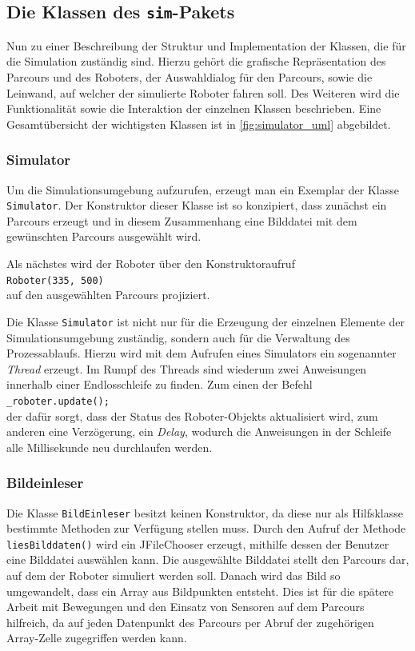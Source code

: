 \documentclass[paper=a4, DIV=calc, BCOR=12mm, twoside=on, onecolumn=on, open = right, titlepage =on, parskip =half-, headsepline = on, footsepline = off, chapterprefix = off, appendixprefix = on, fontsize = 12pt, numbers = noenddot, abstract = on]{scrbook}
\begin{document}
\par \singlespacing
\subsection{Die Klassen des \texttt{sim}-Pakets}
\label{sec:simpaket}
\onehalfspacing
Nun zu einer Beschreibung der Struktur und Implementation der Klassen, die für die Simulation zuständig sind. Hierzu gehört die grafische Repräsentation des Parcours und des Roboters, der Auswahldialog für den Parcours, sowie die Leinwand, auf welcher der simulierte Roboter fahren soll. Des Weiteren wird die Funktionalität sowie die Interaktion der einzelnen Klassen beschrieben. Eine Gesamtübersicht der wichtigsten Klassen ist in \ref{fig:simulator_uml} abgebildet.

\vspace*{-2ex}
\subsubsection{Simulator}

Um die Simulationsumgebung aufzurufen, erzeugt man ein Exemplar der Klasse \texttt{Si\-mu\-la\-tor}. Der Konstruktor dieser Klasse ist so konzipiert, dass zunächst ein Parcours erzeugt und in diesem Zusammenhang eine Bilddatei mit dem gewünschten Parcours ausgewählt wird.

Als nächstes wird der Roboter über den Konstruktoraufruf\\
\hspace*{2em}\texttt{Roboter(335, 500)}\\
auf den ausgewählten Parcours projiziert.

Die Klasse \texttt{Simulator} ist nicht nur für die Erzeugung der einzelnen Elemente der Simulationsumgebung zuständig, sondern auch für die Verwaltung des Prozessablaufs. Hierzu wird mit dem Aufrufen eines Simulators ein sogenannter \emph{Thread} erzeugt. Im Rumpf des Threads sind wiederum zwei Anweisungen innerhalb einer Endlosschleife zu finden. Zum einen der Befehl\\
\hspace*{2em} \texttt{{\_}roboter.update();}\\
der dafür sorgt, dass der Status des Roboter-Objekts aktualisiert wird, zum anderen eine Verzögerung, ein \emph{Delay}, wodurch die Anweisungen in der Schleife alle Millisekunde neu durchlaufen werden. 


\subsubsection{Bildeinleser}
Die Klasse \texttt{BildEinleser} besitzt keinen Konstruktor, da diese nur als Hilfsklasse bestimmte Methoden zur Verfügung stellen muss. Durch den Aufruf der Methode
\texttt{liesBilddaten()} wird ein JFileChooser erzeugt, mithilfe dessen der Benutzer eine Bilddatei auswählen kann. Die ausgewählte Bilddatei stellt den Parcours dar, auf dem der Roboter simuliert werden soll. Danach wird das Bild so umgewandelt, dass ein Array aus Bildpunkten entsteht. Dies ist für die spätere Arbeit mit Bewegungen und den Einsatz von Sensoren auf dem Parcours hilfreich, da auf jeden Datenpunkt des Parcours per Abruf der zugehörigen Array-Zelle zugegriffen werden kann.
\end{document}
